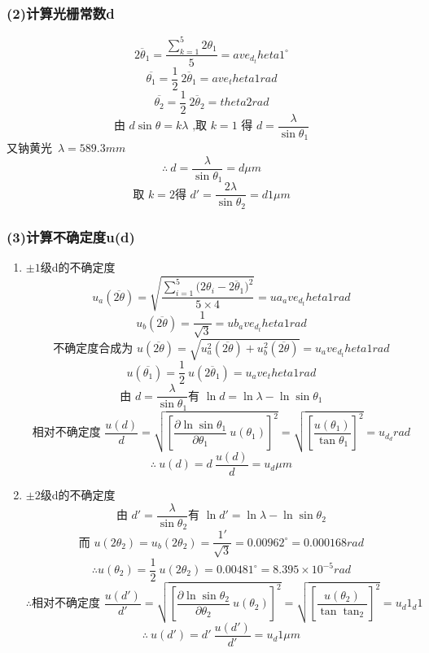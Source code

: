 \subsubsection*{(2)计算光栅常数d}

$$\overline{2{\theta}_1} = \displaystyle\frac{\sum_{k=1}^5 2{\theta}_1}{5} = {{ave_d_theta1}}^{\circ} $$
$$\overline{ {\theta}_1} = \displaystyle\frac12\ \overline{2{\theta}_1} = {{ave_theta1}}rad $$
$$\overline{ {\theta}_2} = \displaystyle\frac12\ \overline{2{\theta}_2} = {{theta2}}rad$$
$$\text{由\ }d\sin{\theta} = k{\lambda}\text{\ ,取\ }k = 1\text{\ 得\ }d = \frac{\lambda}{\sin{\theta}_1}$$
又钠黄光\ ${\lambda} = 589.3mm$
$$\therefore \ d = \displaystyle\frac{\lambda}{\sin{\theta}_1}={{d}}\mu m$$
$$\text{取\ }k=2 \displaystyle\text{得\ }d' = \frac{2\lambda}{\sin{\theta}_2}= {{d1}}\mu m$$
 
\subsubsection*{(3)计算不确定度u(d)}
\begin{enumerate}
  \item $\pm1$级d的不确定度
    $$u_a(\overline{2\theta}) = \displaystyle\sqrt{\frac{\sum_{i=1}^5{(2{\theta}_i-\overline{2{\theta}_1}})^2}{5\times4}}={{ua_ave_d_theta1}}rad$$
    $$u_b(\overline{2\theta}) = \displaystyle\frac{1}{\sqrt3} = {{ub_ave_d_theta1}}rad$$
    $$\text{不确定度合成为\ }u(\overline{2\theta}) = \sqrt{u_a^2(\overline{2\theta})+u_b^2(\overline{2\theta})} = {{u_ave_d_theta1}}rad$$
    $$u(\overline{ {\theta}_1})= \displaystyle\frac12\ u(\overline{2{\theta}_1}) = {{u_ave_theta1}}rad$$
    $$\text{由\ }d = \frac{\lambda}{\sin{ {\theta}_1}} \text{有\ } \ln d = \ln{\lambda}-\ln{\sin{ {\theta}_1} }$$
    $$\text{相对不确定度\ }\frac{u(d)}{d} = \displaystyle\sqrt{ {\left[\frac{\partial{\ln{\sin{ {\theta}_1}}}}{\partial{ {\theta}_1} }\ u({\theta}_1)\right]}^2} = \sqrt{ {\left[\frac{u({\theta}_1)}{\tan{ {\theta}_1}}\right]}^2} = {{u_d_d}}rad$$
    $$\therefore \ u(d) = \displaystyle d\ \frac{u(d)}{d} = {{u_d}}\mu m $$
  \item $\pm2$级d的不确定度
    $$\text{由\ }d' = \frac{\lambda}{\sin{ {\theta}_2}} \text{有\ } \ln d' = \ln{\lambda}-\ln{\sin{ {\theta}_2}}$$
    $$\text{而\ }u(2{\theta}_2) = u_b(2{\theta}_2) = \displaystyle\frac{1'}{\sqrt3} = {0.00962}^\circ = 0.000168rad $$
    $$\therefore u({\theta}_2) = \displaystyle\frac{1}{2}\ u(2{\theta}_2) = {0.00481}^{\circ} = 8.395\times 10^{-5}rad $$
    $$\therefore \text{相对不确定度\ }\frac{u(d')}{d'} = \displaystyle\sqrt{ {\left[\frac{\partial{\ln{\sin{ {\theta}_2}}}}{\partial{  {\theta}_2} }\ u({\theta}_2)\right]}^2} = \sqrt{ {\left[\frac{u({\theta}_2)}{\tan{ {\tan}_2}}\right]}^2} = {{u_d1_d1}}$$
    $$\therefore \ u(d') = \displaystyle d'\ \frac{u(d')}{d'} = {{u_d1}}\mu m$$
\end{enumerate}

